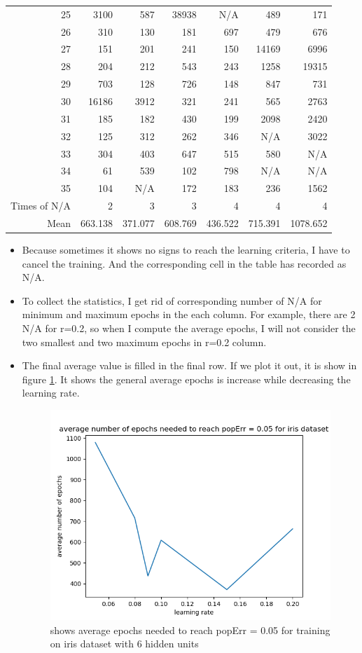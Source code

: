 \documentclass[11pt]{article}
\begin{document}
\begin{table}[htb]
\begin{tabular}{rrrrrrr}
25 & 3100 & 587 & 38938 & N/A & 489 & 171\\
26 & 310 & 130 & 181 & 697 & 479 & 676\\
27 & 151 & 201 & 241 & 150 & 14169 & 6996\\
28 & 204 & 212 & 543 & 243 & 1258 & 19315\\
29 & 703 & 128 & 726 & 148 & 847 & 731\\
30 & 16186 & 3912 & 321 & 241 & 565 & 2763\\
31 & 185 & 182 & 430 & 199 & 2098 & 2420\\
32 & 125 & 312 & 262 & 346 & N/A & 3022\\
33 & 304 & 403 & 647 & 515 & 580 & N/A\\
34 & 61 & 539 & 102 & 798 & N/A & N/A\\
35 & 104 & N/A & 172 & 183 & 236 & 1562\\
\hline
Times of N/A & 2 & 3 & 3 & 4 & 4 & 4\\
Mean & 663.138 & 371.077 & 608.769 & 436.522 & 715.391 & 1078.652\\
\end{tabular}
\end{table}

\begin{itemize}
\item Because sometimes it shows no signs to reach the learning criteria, I have to cancel the training. And the corresponding cell in the table has recorded as N/A.
\item To collect the statistics, I get rid of corresponding number of N/A for minimum and maximum epochs in the each column. For example, there are 2 N/A for r=0.2, so when I compute the average epochs, I will not consider the two smallest and two maximum epochs in r=0.2 column.
\item The final average value is filled in the final row. If we plot it out, it is show in figure \ref{fig-average-epochs}. It shows the general average epochs is increase while decreasing the learning rate.
\begin{figure}[htb]
\centering
\includegraphics[width=.9\linewidth]{./average_epochs.png}
\caption{shows average epochs needed to reach popErr = 0.05 for training on iris dataset with 6 hidden units \label{fig-average-epochs}}
\end{figure}
\end{itemize}
\end{document}
